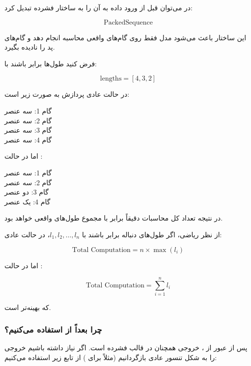 \documentclass{article}
\begin{document}
در  می‌توان قبل از ورود داده به  آن را به ساختار فشرده تبدیل کرد:

\begin{equation}
	\text{PackedSequence}
\end{equation}

این ساختار باعث می‌شود مدل فقط روی گام‌های واقعی محاسبه انجام دهد و گام‌های پد را نادیده بگیرد.

فرض کنید طول‌ها برابر باشند با:

\begin{equation}
	\text{lengths} = [4, 3, 2]
\end{equation}

در حالت عادی پردازش به صورت زیر است:

\begin{center}
	گام 1: سه عنصر \\
	گام 2: سه عنصر \\
	گام 3: سه عنصر \\
	گام 4: سه عنصر
\end{center}

اما در حالت :

\begin{center}
	گام 1: سه عنصر \\
	گام 2: سه عنصر \\
	گام 3: دو عنصر \\
	گام 4: یک عنصر
\end{center}

در نتیجه تعداد کل محاسبات دقیقاً برابر با مجموع طول‌های واقعی خواهد بود.

از نظر ریاضی، اگر طول‌های دنباله برابر باشند با \(l_1, l_2, \dots, l_n\)، در حالت عادی:

\begin{equation}
	\text{Total Computation} = n \times \max(l_i)
\end{equation}

اما در حالت :

\begin{equation}
	\text{Total Computation} = \sum_{i=1}^{n} l_i
\end{equation}

که بهینه‌تر است.

\subsubsection{چرا بعداً از  استفاده می‌کنیم؟}

پس از عبور از ، خروجی همچنان در قالب فشرده است. 
اگر نیاز داشته باشیم خروجی را به شکل تنسور عادی بازگردانیم (مثلاً برای ) از تابع زیر استفاده می‌کنیم:
\end{document}
